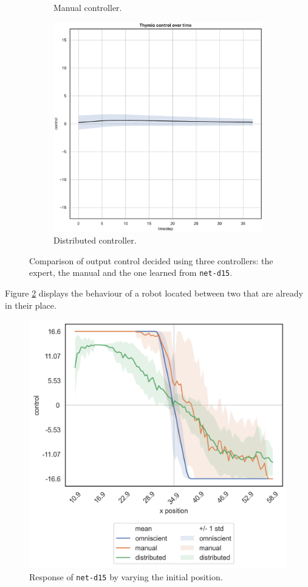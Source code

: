 \begin{figure}[!htb]
\begin{subfigure}[h]{0.3\textwidth}
		\caption{Manual controller.}
	\end{subfigure}
	\hfill
	\begin{subfigure}[h]{0.3\textwidth}
		\centering
		\includegraphics[width=\textwidth]{contents/images/net-d15/control-overtime-learned_distributed}
		\caption{Distributed controller.}
	\end{subfigure}
	\caption[Evaluation of the control decided by \texttt{net-d15}.]{Comparison 
		of output control decided using three controllers: the expert, the manual 
		and the one learned from \texttt{net-d15}.}
	\label{fig:net-d15control}
\end{figure}

Figure \ref{fig:net-d15responseposition} displays the behaviour of a robot 
located between two that are already in their place.

\begin{figure}[!htb]
	\centering
	\includegraphics[width=.45\textwidth]{contents/images/net-d15/response-varying_init_position-distributed}%
	\caption{Response of \texttt{net-d15} by varying the initial position.}
	\label{fig:net-d15responseposition}
\end{figure}

